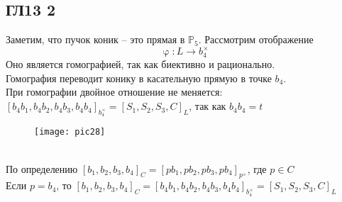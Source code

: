 \subsection*{ГЛ13 2}
 Заметим, что пучок коник -- это прямая в $\mathbb{P}_5$. Рассмотрим отображение
\begin{equation*}
	\upvarphi: L \rightarrow b_4^\times 
\end{equation*}
Оно является гомографией, так как биективно и рационально. \\
Гомография переводит конику в касательную прямую в точке $b_4$.\\
При гомографии двойное отношение не меняется: $[b_4b_1, b_4b_2, b_4b_3, b_4b_4]_{b_4^\times}=[S_1, S_2, S_3, C]_L$, так как $b_4b_4=t$\\ 
\begin{figure}[h!]
	\center\texttt{[image: pic28]}
\end{figure}\\
По определению   $\left[b_{1}, b_{2}, b_{3}, b_{4}\right]_C=[pb_1, pb_2, pb_3, pb_4]_{p^\times}$, где $p \in C$ \\
Если $p=b_4$, то $\left[b_{1}, b_{2}, b_{3}, b_{4}\right]_C=[b_4b_1, b_4b_2, b_4b_3, b_4b_4]_{b_4^\times}=[S_1, S_2, S_3, C]_L$\\